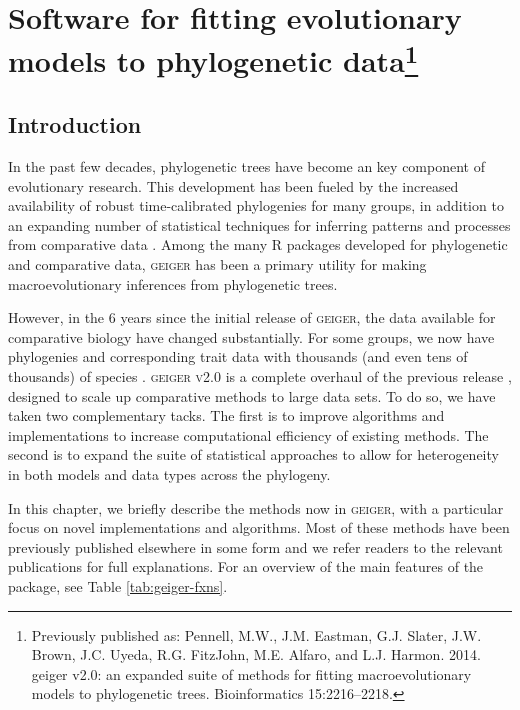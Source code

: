 \chapter[Software for fitting evolutionary models to phylogenetic data]{Software for fitting evolutionary models to phylogenetic data\footnote{Previously published as: Pennell, M.W., J.M. Eastman, G.J. Slater, J.W. Brown, J.C. Uyeda,
  R.G. FitzJohn, M.E. Alfaro, and L.J. Harmon. 2014.
  geiger v2.0: an expanded suite of methods for fitting macroevolutionary
  models to phylogenetic trees. Bioinformatics 15:2216--2218.}} 
\label{chap:geiger}

\section{Introduction}

In the past few decades, phylogenetic trees have become an key component of evolutionary research. This development has been fueled by the increased availability of robust time-calibrated phylogenies for many groups, in addition to an expanding number of statistical techniques for inferring patterns and processes from comparative data \citep[reviewed in][]{PennellHarmon}. Among the many R packages developed for phylogenetic and comparative data, \textsc{geiger} \citep{Harmon2008} has been a primary utility for making macroevolutionary inferences from phylogenetic trees. 

However, in the 6 years since the initial release of \textsc{geiger}, the data available for comparative biology have changed substantially. For some groups, we now have phylogenies and corresponding trait data with thousands (and even tens of thousands) of species \citep[e.g.,][]{Jetz2012, Rabosky2012, PyronBurbrink2013, ksi,Zanne}. \textsc{geiger v2.0} is a complete overhaul of the previous release \citep{Harmon2008}, designed to scale up comparative methods to large data sets. To do so,  we have taken two complementary tacks. The first is to improve algorithms and implementations to increase computational efficiency of existing methods. The second is to expand the suite of statistical approaches to allow for heterogeneity in both models and data types across the phylogeny.  

In this chapter, we briefly describe the methods now in \textsc{geiger}, with a particular focus on novel implementations and algorithms. Most of these methods have been previously published elsewhere in some form and we refer readers to the relevant publications for full explanations. For an overview of the main features of the package, see Table \ref{tab:geiger-fxns}.

